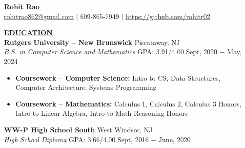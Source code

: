 \documentclass{article}
\begin{document}
\begin{center}
\thispagestyle{empty}
\LARGE \textbf{Rohit Rao\\}
\normalsize \href{mailto:rohitrao862@gmail.com}{rohitrao862@gmail.com} $\mid$ 609-865-7949 $\mid$ \href{https://github.com/rohitr02}{https://github.com/rohitr02}    \\
\hrulefill
\end{center}





\noindent \textbf{\underline{EDUCATION}} \\
\textbf{Rutgers University -- New Brunswick} \hfill Piscataway, NJ \\
\textit{B.S. in Computer Science and Mathematics}  \hspace{1.40cm} GPA: 3.91/4.00 \hfill Sept, 2020 $-$ May, 2024
\begin{itemize}[noitemsep,nolistsep, leftmargin=*]
    \item {\textbf{Coursework -- Computer Science:} Intro to CS, Data Structures, Computer Architecture, Systems Programming}
    \item {\textbf{Coursework -- Mathematics:} Calculus 1, Calculus 2, Calculus 3 Honors, Intro to Linear Algebra, Intro to Math Reasoning Honors} \\
\end{itemize}
\textbf{WW-P High School South} \hfill West Windsor, NJ \\
\textit{High School Diploma} \hfill{GPA: 3.66/4.00} \hfill Sept, 2016 $-$ June, 2020 \\
\end{document}

